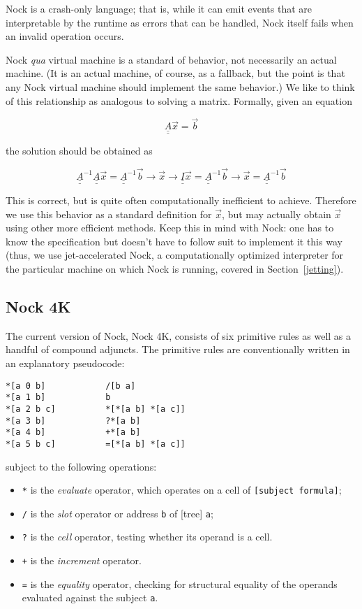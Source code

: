 Nock is a crash-only language; that is, while it can emit events that are interpretable by the runtime as errors that can be handled, Nock itself fails when an invalid operation occurs.

Nock \emph{qua} virtual machine is a standard of behavior, not necessarily an actual machine.  (It is an actual machine, of course, as a fallback, but the point is that any Nock virtual machine should implement the same behavior.)  We like to think of this relationship as analogous to solving a matrix.  Formally, given an equation

$$
\underline{\underline{A}} \vec{x} = \vec{b}
$$

the solution should be obtained as

$$
\underline{\underline{A}}^{-1} \underline{\underline{A}} \vec{x}
=
\underline{\underline{A}}^{-1} \vec{b} \rightarrow \vec{x}
\rightarrow
\underline{\underline{I}} \vec{x}
=
\underline{\underline{A}}^{-1} \vec{b}
\rightarrow
\vec{x}
=
\underline{\underline{A}}^{-1} \vec{b}
$$

This is correct, but is quite often computationally inefficient to achieve.  Therefore we use this behavior as a standard definition for $\vec{x}$, but may actually obtain $\vec{x}$ using other more efficient methods.  Keep this in mind with Nock:  one has to know the specification but doesn't have to follow suit to implement it this way (thus, we use jet-accelerated Nock, a computationally optimized interpreter for the particular machine on which Nock is running, covered in Section~\ref{jetting}).

\subsection{Nock 4K}

The current version of Nock, Nock 4K, consists of six primitive rules as well as a handful of compound adjuncts.  The primitive rules are conventionally written in an explanatory pseudocode:

\begin{lstlisting}[style=nonumbers]
*[a 0 b]            /[b a]
*[a 1 b]            b
*[a 2 b c]          *[*[a b] *[a c]]
*[a 3 b]            ?*[a b]
*[a 4 b]            +*[a b]
*[a 5 b c]          =[*[a b] *[a c]]
\end{lstlisting}

subject to the following operations:

\begin{itemize}
  \item  \texttt{*} is the \emph{evaluate} operator, which operates on a cell of \texttt{[subject formula]};
  \item  \texttt{/} is the \emph{slot} operator or address \texttt{b} of [tree] \texttt{a};
  \item  \texttt{?} is the \emph{cell} operator, testing whether its operand is a cell.
  \item  \texttt{+} is the \emph{increment} operator.
  \item  \texttt{=} is the \emph{equality} operator, checking for structural equality of the operands evaluated against the subject \texttt{a}.
\end{itemize}

